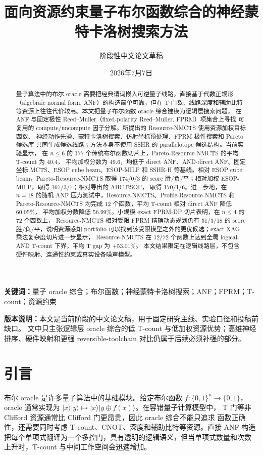 \documentclass[UTF8,fontset=macnew,11pt]{ctexart}
\title{面向资源约束量子布尔函数综合的神经蒙特卡洛树搜索方法}
\author{阶段性中文论文草稿}
\date{2026年7月7日}
\newcommand{\method}{Resource-NMCTS}
\newcommand{\paretomethod}{Pareto-Resource-NMCTS}
\begin{document}
\maketitle

\begin{abstract}
量子算法中的布尔 oracle 需要把经典谓词嵌入可逆量子线路。直接基于代数正规形
（algebraic normal form, ANF）的构造简单可靠，但在 T 门数、线路深度和辅助比特
等资源上往往代价较高。本文把量子布尔函数 oracle 综合建模为逻辑层搜索问题，
在 ANF 与固定极性 Reed--Muller（fixed-polarity Reed--Muller, FPRM）项集合上寻找
可复用的 compute/uncompute 因子分解。所提出的 \method{} 使用资源加权目标函数、
神经动作先验、蒙特卡洛树搜索、仿射坐标预处理、FPRM 极性搜索和 Pareto 候选库
共同生成候选线路；方法本身不使用 SSHR 的 parallelotope 候选结构。当前实验显示，
在 $n\leq 6$ 的 177 个传统布尔函数切片上，\paretomethod{} 的平均 T-count 为 40.4，
平均加权分数为 49.6，均低于 direct ANF、AND-direct ANF、固定坐标 MCTS、ESOP
cube beam、ESOP-MILP 和 SSHR-H 等基线。相对 ESOP cube beam，\paretomethod{} 取得
174/0/3 的 score 胜/负/平；相对加权 ESOP-MILP，取得 167/3/7；相对导出的 ABC-ESOP，
取得 170/1/6。进一步地，在 $n=18$ 的随机 ANF 压力测试中，\method{}、Profile-Resource-NMCTS
和 \paretomethod{} 均完成 12 个函数，平均 T-count 相对 direct ANF 降低 60.05\%，
平均加权分数降低 56.99\%。小规模 exact FPRM-DP 切片表明，在 $n\leq 4$ 的 72 个函数上，
\method{} 相对受限 FPRM 精确动态规划仍有 51/3/18 的 score 胜/负/平，说明资源感知
portfolio 可以找到该受限模型之外的更优候选；exact XAG 乘法复杂度切片进一步显示，
\method{} 在 12/72 个函数上达到全局 logical-AND T-count 下界，平均 T gap 为 +53.01\%。
本文结果限定在逻辑线路层，不包含
硬件映射、连通性约束或真实设备噪声模型。
\end{abstract}

\noindent\textbf{关键词：}量子 oracle 综合；布尔函数；神经蒙特卡洛树搜索；ANF；FPRM；T-count；资源约束

\vspace{0.5em}
\noindent\textbf{版本说明：}本文是当前阶段的中文论文稿，用于固定研究主线、实验口径和投稿前缺口。
文中只主张逻辑层 oracle 综合的低 T-count 与低加权资源优势；高维神经排序、硬件映射和更强
reversible-toolchain 对比仍属于后续必须补强的部分。

\section{引言}

布尔 oracle 是许多量子算法中的基础模块。给定布尔函数
$f:\{0,1\}^{n}\rightarrow\{0,1\}$，oracle 通常实现为
$|x\rangle|y\rangle\mapsto |x\rangle|y\oplus f(x)\rangle$。在容错量子计算模型中，
T 门等非 Clifford 资源通常比 Clifford 门更昂贵，因此 oracle 综合不能只追求
函数正确性，还需要同时考虑 T-count、CNOT、深度和辅助比特等资源。直接 ANF
构造把每个单项式翻译为一个多控门，具有透明的逻辑语义，但当单项式数量和次数
上升时，T-count 与中间工作空间会迅速增加。
\end{document}
